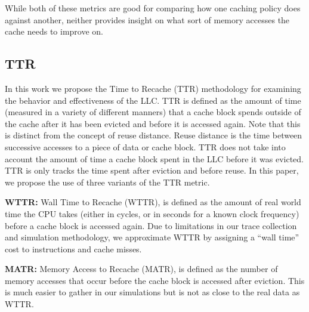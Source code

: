 While both of these metrics are good for comparing how one caching policy does against another,
	neither provides insight on what sort of memory accesses the cache needs to improve on.

%

\subsection{TTR}
\label{sec:metrics}
In this work we propose the Time to Recache (TTR) methodology for examining the behavior and effectiveness of the LLC.
TTR is defined as the amount of time (measured in a variety of different manners) that a cache block spends outside of the cache after it has been evicted and before it is accessed again.
Note that this is distinct from the concept of reuse distance. 
Reuse distance is the time between successive accesses to a piece of data or cache block. 
TTR does not take into account the amount of time a cache block spent in the LLC before it was evicted.  
TTR is only tracks the time spent after eviction and before reuse.
In this paper, we propose the use of three variants of the TTR metric. 

\textbf{WTTR:}
Wall Time to Recache (WTTR), is defined as the amount of real world time the CPU takes (either in cycles, or in seconds for a known clock frequency) before a cache block is accessed again.
Due to limitations in our trace collection and simulation methodology, we approximate WTTR by assigning a ``wall time'' cost to instructions and cache misses.

\textbf{MATR:}
Memory Access to Recache (MATR), is defined as the number of memory accesses that occur before the cache block is accessed after eviction.
This is much easier to gather in our simulations but is not as close to the real data as WTTR.

